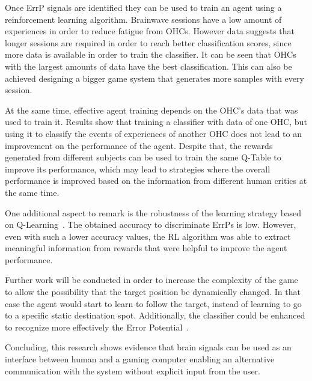 \documentclass[journal]{IEEEtran}
\begin{document}
{{Once ErrP signals are identified they can be used to train an agent using a reinforcement learning algorithm. Brainwave sessions have a low amount of experiences in order to reduce fatigue from OHCs. However data suggests that longer sessions are required in order to reach better classification scores, since more data is available in order to train the classifier. It can be seen that OHCs with the largest amounts of data have the best classification. This can also be achieved designing a bigger game system that generates more samples with every session.

At the same time, effective agent training depends on the OHC's data that was used to train it. Results show that training a classifier with data of one OHC, but using it to classify the events of experiences of another OHC does not lead to an improvement on the performance of the agent. Despite that, the rewards generated from different subjects can be used to train the same Q-Table to improve its performance, which may lead to strategies where the overall performance is improved based on the information from different human critics at the same time.

One additional aspect to remark is the robustness of the learning strategy based on Q-Learning~\cite{Bauer2015,Rubin2012}.  The obtained accuracy to discriminate ErrPs is low.  However, even with such a lower accuracy values, the RL algorithm was able to extract meaningful information from rewards that were helpful to improve the agent performance.  

Further work will be conducted in order to increase the complexity of the game to allow the possibility that the target position be dynamically changed.  In that case the agent would start to learn to follow the target, instead of learning to go to a specific static destination spot.  Additionally, the classifier could be enhanced to recognize more effectively the Error Potential~\cite{Iwane2017}.

Concluding, this research shows evidence that brain signals can be used as an interface between human and a gaming computer enabling an alternative communication with the system without explicit input from the user.




}}
\end{document}
